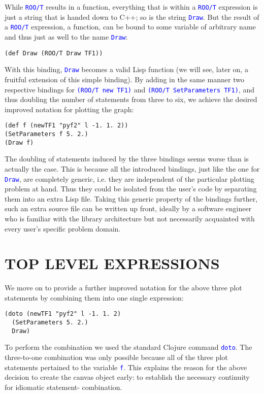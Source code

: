 \documentclass[twocolumn]{article}
\begin{document}
While \texttt{\textcolor{blue}{ROO/T}} results in a function, everything that is within a \texttt{\textcolor{blue}{ROO/T}} expression is just a string that is handed down to C++; so is the string \texttt{\textcolor{blue}{Draw}}. But the result of a \texttt{\textcolor{blue}{ROO/T}} expression, a function, can be bound to some variable of arbitrary name and thus just as well to the name \texttt{\textcolor{blue}{Draw}}:
{\color{blue}\begin{verbatim}
(def Draw (ROO/T Draw TF1))
\end{verbatim}}
With this binding, \texttt{\textcolor{blue}{Draw}} becomes a valid Lisp function (we will see, later on, a fruitful extension of this simple binding). By adding in the same manner two respective bindings for \texttt{\textcolor{blue}{(ROO/T new TF1)}} and \texttt{\textcolor{blue}{(ROO/T SetParameters TF1)}}, and thus doubling the number of statements from three to six, we achieve the desired improved notation for plotting the graph:
{\color{blue}\begin{verbatim}
(def f (newTF1 "pyf2" l -1. 1. 2))
(SetParameters f 5. 2.)
(Draw f)
\end{verbatim}}
The doubling of statements induced by the three bindings seems worse than is actually the case. This is because all the introduced bindings, just like the one for \texttt{\textcolor{blue}{Draw}}, are completely generic, i.e. they are independent of the particular plotting problem at hand. Thus they could be isolated from the user’s code by separating them into an extra Lisp file. Taking this generic property of the bindings further, such an extra source file can be written up front, ideally by a software engineer who is familiar with the library architecture but not necessarily acquainted with every user’s specific problem domain.

\section{TOP LEVEL EXPRESSIONS}
We move on to provide a further improved notation for the above three plot statements by combining them into one single expression:
{\color{blue} \begin{verbatim}
(doto (newTF1 "pyf2" l -1. 1. 2)
  (SetParameters 5. 2.)
  Draw)
\end{verbatim}}
To perform the combination we used the standard Clojure command \texttt{\textcolor{blue}{doto}}. The three-to-one combination was only possible because all of the three plot statements pertained to the variable \texttt{\textcolor{blue}{f}}. This explains the reason for the above decision to create the canvas object early: to establish the necessary continuity for idiomatic statement- combination.
\end{document}
